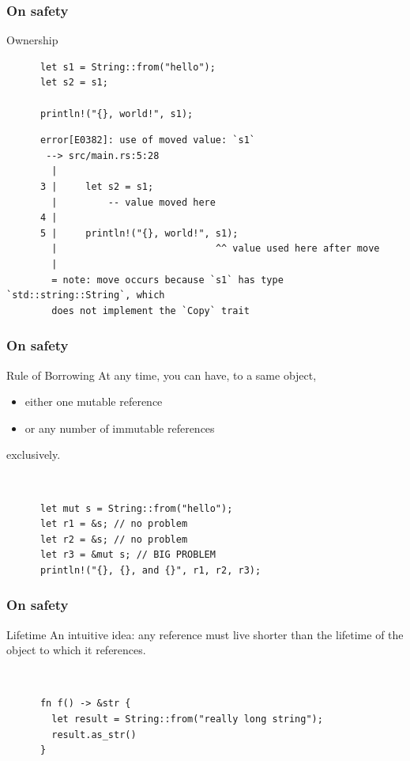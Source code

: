 \documentclass[lualatex,utf8]{beamer}
\begin{document}
\begin{frame}[fragile]
  \frametitle{On safety}
  \begin{alertblock}{Ownership}
    \begin{verbatim}
      let s1 = String::from("hello");
      let s2 = s1;

      println!("{}, world!", s1);
    \end{verbatim}
    \begin{verbatim}
      error[E0382]: use of moved value: `s1`
       --> src/main.rs:5:28
        |
      3 |     let s2 = s1;
        |         -- value moved here
      4 |
      5 |     println!("{}, world!", s1);
        |                            ^^ value used here after move
        |
        = note: move occurs because `s1` has type `std::string::String`, which
        does not implement the `Copy` trait
    \end{verbatim}
  \end{alertblock}
\end{frame}

\begin{frame}[fragile]
  \frametitle{On safety}
  \begin{block}{Rule of Borrowing}
    At any time, you can have, to a same object,
    \begin{itemize}
    \item either one mutable reference
    \item or any number of immutable references
    \end{itemize}
    exclusively.
  \end{block}
  \begin{alertblock}{~}
    \begin{verbatim}
      let mut s = String::from("hello");
      let r1 = &s; // no problem
      let r2 = &s; // no problem
      let r3 = &mut s; // BIG PROBLEM
      println!("{}, {}, and {}", r1, r2, r3);
    \end{verbatim}
  \end{alertblock}
\end{frame}

\begin{frame}[fragile]
  \frametitle{On safety}
  \begin{block}{Lifetime}
    An intuitive idea: any reference must live shorter than the lifetime of the object to which it references.
  \end{block}
  \begin{alertblock}{~}
    \begin{verbatim}
      fn f() -> &str {
        let result = String::from("really long string");
        result.as_str()
      }
    \end{verbatim}
  \end{alertblock}
\end{frame}
\end{document}
